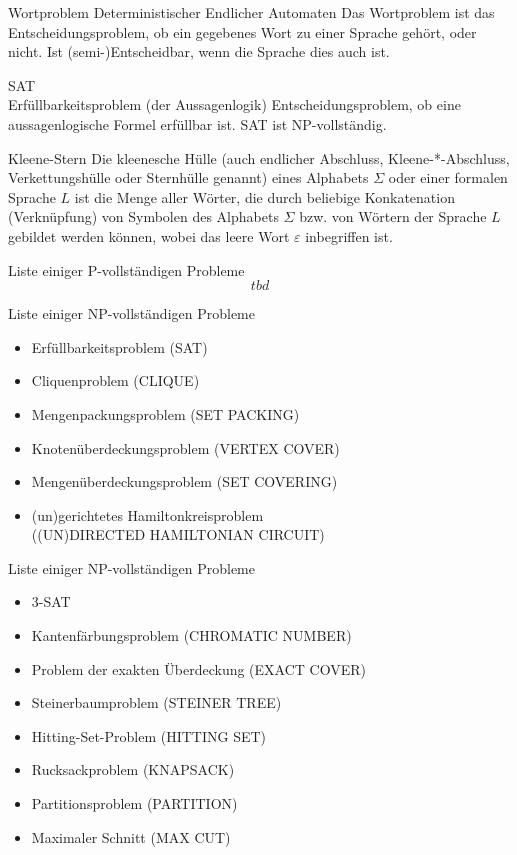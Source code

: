\documentclass[a7paper,print,grid=both]{kartei}
\begin{document}
\begin{karte}{Wortproblem Deterministischer Endlicher Automaten}
Das Wortproblem ist das Entscheidungsproblem, ob ein gegebenes Wort zu einer Sprache gehört, oder nicht. Ist (semi-)Entscheidbar, wenn die Sprache dies auch ist.
\end{karte}
\begin{karte}{SAT\\Erfüllbarkeitsproblem (der Aussagenlogik)}
Entscheidungsproblem, ob eine aussagenlogische Formel erfüllbar ist. SAT ist NP-vollständig.
\end{karte}
\begin{karte}{Kleene-Stern}
Die kleenesche Hülle (auch endlicher Abschluss, Kleene-*-Abschluss, Verkettungshülle oder Sternhülle genannt) eines Alphabets $\Sigma$ oder einer formalen Sprache $L$ ist die Menge aller Wörter, die durch beliebige Konkatenation (Verknüpfung) von Symbolen des Alphabets $\Sigma$ bzw. von Wörtern der Sprache $L$ gebildet werden können, wobei das leere Wort $\varepsilon$ inbegriffen ist.
\end{karte}
\begin{karte}{Liste einiger P-vollständigen Probleme}
\[tbd\]
\end{karte}
\begin{karte}{Liste einiger NP-vollständigen Probleme}
\begin{itemize}
    \setlength{\itemindent}{-0.5cm}
    \setlength{\itemsep}{-0.1cm}
    \item Erfüllbarkeitsproblem (SAT)
    \item Cliquenproblem (CLIQUE)
    \item Mengenpackungsproblem (SET PACKING)
    \item Knotenüberdeckungsproblem (VERTEX COVER)
    \item Mengenüberdeckungsproblem (SET COVERING)
    \item (un)gerichtetes Hamiltonkreisproblem\\((UN)DIRECTED HAMILTONIAN CIRCUIT)
\end{itemize}
\end{karte}
\begin{karte}{Liste einiger NP-vollständigen Probleme}
\begin{itemize}
    \setlength{\itemindent}{-0.5cm}
    \setlength{\itemsep}{-0.1cm}
    \item 3-SAT
    \item Kantenfärbungsproblem (CHROMATIC NUMBER)
    \item Problem der exakten Überdeckung (EXACT COVER)
    \item Steinerbaumproblem (STEINER TREE)
    \item Hitting-Set-Problem (HITTING SET)
    \item Rucksackproblem (KNAPSACK)
    \item Partitionsproblem (PARTITION)
    \item Maximaler Schnitt (MAX CUT)
\end{itemize}
\end{karte}
\end{document}
